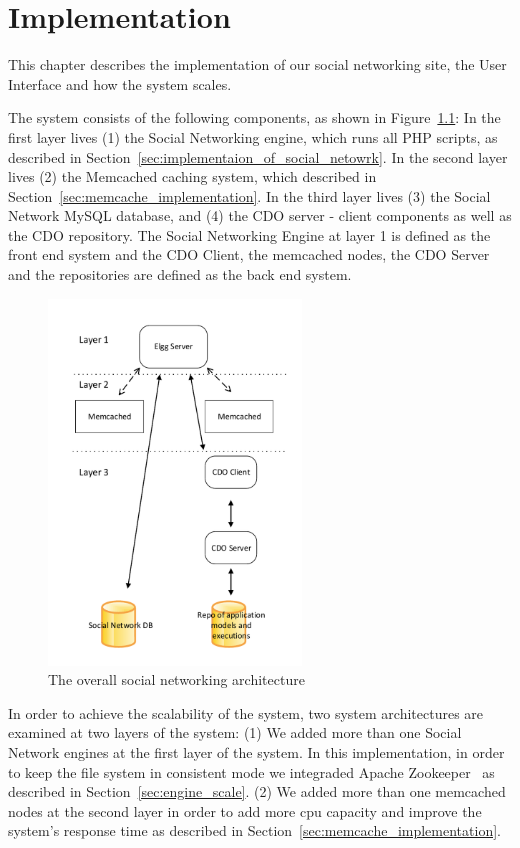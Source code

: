 \chapter{Implementation}
\label{chap:implementation}
This chapter describes the implementation of our social networking site, the User Interface and how the system scales.

The system consists of the following components, as shown in Figure~\ref{fig:system_architecture}: In the first layer lives (1) the Social Networking engine, which runs all PHP scripts, as described in Section~\ref{sec:implementaion_of_social_netowrk}. 
In the second layer lives (2) the Memcached caching system, which described in Section~\ref{sec:memcache_implementation}. 
In the third layer lives (3) the Social Network MySQL database, and (4) the CDO server - client components as well as the CDO repository. The Social Networking Engine at layer 1 is defined as the front end system and the CDO Client, the memcached nodes, the CDO Server and the repositories are defined as the back end system. 

\begin{figure}[h]
	\centering
	\includegraphics[width=0.6\textwidth,natwidth=200,natheight=150]{./fig/system_architecture.pdf}
	\caption{The overall social networking architecture}
	\label{fig:system_architecture}
\end{figure}

In order to achieve the scalability of the system, two system architectures are examined at two layers of the system: (1) We added more than one Social Network engines at the first layer of the system. In this implementation, in order to keep the file system in consistent mode we integraded Apache Zookeeper~\cite{zookeeper_url} as described in Section~\ref{sec:engine_scale}. (2) We added more than one memcached nodes at the second layer in order to add more cpu capacity and improve the system's response time as described in Section~\ref{sec:memcache_implementation}.

